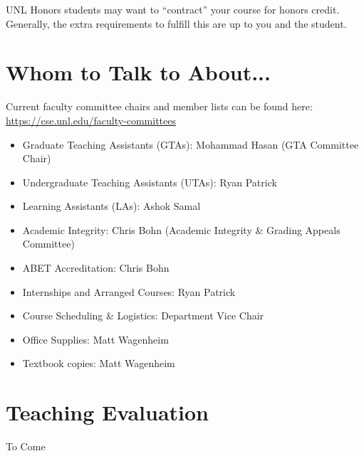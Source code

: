 \documentclass[12pt]{scrartcl}
\begin{document}
UNL Honors students may want to ``contract'' your course for honors
credit.  Generally, the extra requirements to fulfill this are up
to you and the student.


\section{Whom to Talk to About...}

Current faculty committee chairs and member lists can be found
here: \url{https://cse.unl.edu/faculty-committees}

\begin{itemize}
  \item Graduate Teaching Assistants (GTAs): Mohammad Hasan (GTA Committee Chair)
  \item Undergraduate Teaching Assistants (UTAs): Ryan Patrick
  \item Learning Assistants (LAs): Ashok Samal
  \item Academic Integrity: Chris Bohn (Academic Integrity \& Grading Appeals Committee)
  \item ABET Accreditation: Chris Bohn
  \item Internships and Arranged Courses: Ryan Patrick
  \item Course Scheduling \& Logistics: Department Vice Chair
  \item Office Supplies: Matt Wagenheim
  \item Textbook copies: Matt Wagenheim
\end{itemize}

\section{Teaching Evaluation}

To Come
\end{document}
